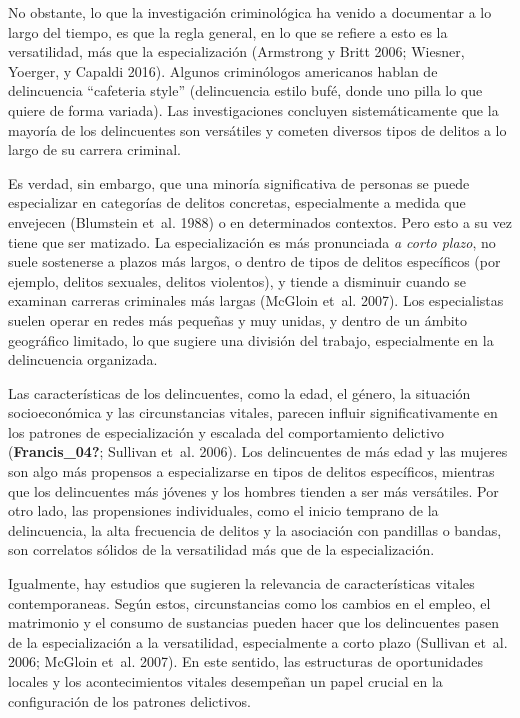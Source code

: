 \documentclass[
  spanish,
  letterpaper,
  DIV=11,
  numbers=noendperiod]{scrreprt}
\begin{document}
No obstante, lo que la investigación criminológica ha venido a
documentar a lo largo del tiempo, es que la regla general, en lo que se
refiere a esto es la versatilidad, más que la especialización (Armstrong
y Britt 2006; Wiesner, Yoerger, y Capaldi 2016). Algunos criminólogos
americanos hablan de delincuencia ``cafeteria style'' (delincuencia
estilo bufé, donde uno pilla lo que quiere de forma variada). Las
investigaciones concluyen sistemáticamente que la mayoría de los
delincuentes son versátiles y cometen diversos tipos de delitos a lo
largo de su carrera criminal.

Es verdad, sin embargo, que una minoría significativa de personas se
puede especializar en categorías de delitos concretas, especialmente a
medida que envejecen (Blumstein et~al. 1988) o en determinados
contextos. Pero esto a su vez tiene que ser matizado. La especialización
es más pronunciada \emph{a corto plazo}, no suele sostenerse a plazos
más largos, o dentro de tipos de delitos específicos (por ejemplo,
delitos sexuales, delitos violentos), y tiende a disminuir cuando se
examinan carreras criminales más largas (McGloin et~al. 2007). Los
especialistas suelen operar en redes más pequeñas y muy unidas, y dentro
de un ámbito geográfico limitado, lo que sugiere una división del
trabajo, especialmente en la delincuencia organizada.

Las características de los delincuentes, como la edad, el género, la
situación socioeconómica y las circunstancias vitales, parecen influir
significativamente en los patrones de especialización y escalada del
comportamiento delictivo (\textbf{Francis\_04?}; Sullivan et~al. 2006).
Los delincuentes de más edad y las mujeres son algo más propensos a
especializarse en tipos de delitos específicos, mientras que los
delincuentes más jóvenes y los hombres tienden a ser más versátiles. Por
otro lado, las propensiones individuales, como el inicio temprano de la
delincuencia, la alta frecuencia de delitos y la asociación con
pandillas o bandas, son correlatos sólidos de la versatilidad más que de
la especialización.

Igualmente, hay estudios que sugieren la relevancia de características
vitales contemporaneas. Según estos, circunstancias como los cambios en
el empleo, el matrimonio y el consumo de sustancias pueden hacer que los
delincuentes pasen de la especialización a la versatilidad,
especialmente a corto plazo (Sullivan et~al. 2006; McGloin et~al. 2007).
En este sentido, las estructuras de oportunidades locales y los
acontecimientos vitales desempeñan un papel crucial en la configuración
de los patrones delictivos.
\end{document}
